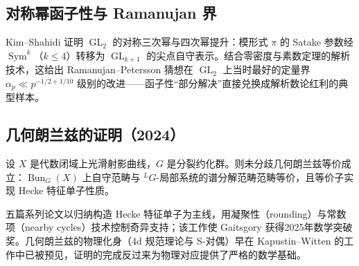 \subsection{对称幂函子性与 Ramanujan 界}

Kim--Shahidi 证明 $\operatorname{GL}_2$ 的对称三次幂与四次幂提升\cite{kimshahidi2002}：模形式 $\pi$ 的 Satake 参数经 $\operatorname{Sym}^k$（$k \le 4$）转移为 $\operatorname{GL}_{k+1}$ 的尖点自守表示。结合零密度与素数定理的解析技术，这给出 Ramanujan--Petersson 猜想在 $\operatorname{GL}_2$ 上当时最好的定量界 $\alpha_p \ll p^{-1/2+1/10}$ 级别的改进——函子性“部分解决”直接兑换成解析数论红利的典型样本。

\subsection{几何朗兰兹的证明（2024）}

\begin{theorem}\label{thm:geometric}
    设 $X$ 是代数闭域上光滑射影曲线，$G$ 是分裂约化群。则未分歧几何朗兰兹等价成立：$\operatorname{Bun}_G(X)$ 上自守范畴与 $^LG$-局部系统的谱分解范畴范畴等价，且等价子实现 Hecke 特征单子性质。
\end{theorem}

五篇系列论文\cite{gaitsgoryraskin2024}以归纳构造 Hecke 特征单子为主线，用凝聚性（rounding）与常数项（nearby cycles）技术控制奇异支持；该工作使 Gaitsgory 获得2025年数学突破奖。几何朗兰兹的物理化身（4d 规范理论与 S-对偶）早在 Kapustin--Witten 的工作中已被预见，证明的完成反过来为物理对应提供了严格的数学基础。

